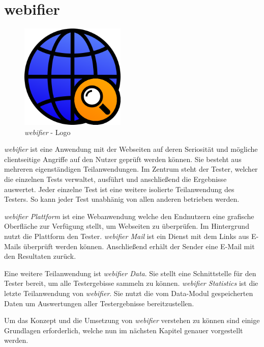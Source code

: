 \section{webifier}

\begin{figure}[H]
  \centering
  \includegraphics[width=5cm]{images/webifier}
  \caption{\textit{webifier} - Logo}
  \label{fig:webifier-logo}
\end{figure}

\textit{webifier} ist eine Anwendung mit der Webseiten auf deren Seriosität und mögliche
clientseitige Angriffe auf den Nutzer geprüft werden können. Sie besteht aus mehreren
eigenständigen Teilanwendungen. Im Zentrum steht der Tester, welcher die einzelnen Tests
verwaltet, ausführt und anschließend die Ergebnisse auswertet. Jeder einzelne Test ist eine weitere isolierte
Teilanwendung des Testers. So kann jeder Test unabhänig von allen anderen betrieben werden.

\textit{webifier Plattform} ist eine Webanwendung welche den Endnutzern eine grafische
Oberfläche zur Verfügung stellt, um Webseiten zu überprüfen. Im Hintergrund nutzt die Plattform
den Tester. \textit{webifier Mail} ist ein Dienst mit dem Links aus E-Mails überprüft werden können.
Anschließend erhält der Sender eine E-Mail mit den Resultaten zurück.

Eine weitere Teilanwendung ist \textit{webifier Data}. Sie stellt eine Schnittstelle
für den Tester bereit, um alle Testergebisse sammeln zu können. \textit{webifier Statistics} ist die
letzte Teilanwendung von \textit{webifier}. Sie nutzt die vom Data-Modul gespeicherten Daten um
Auswertungen aller Testergebnisse bereitzustellen.

Um das Konzept und die Umsetzung von \textit{webifier} verstehen zu können sind einige Grundlagen
erforderlich, welche nun im nächsten Kapitel genauer vorgestellt werden.
